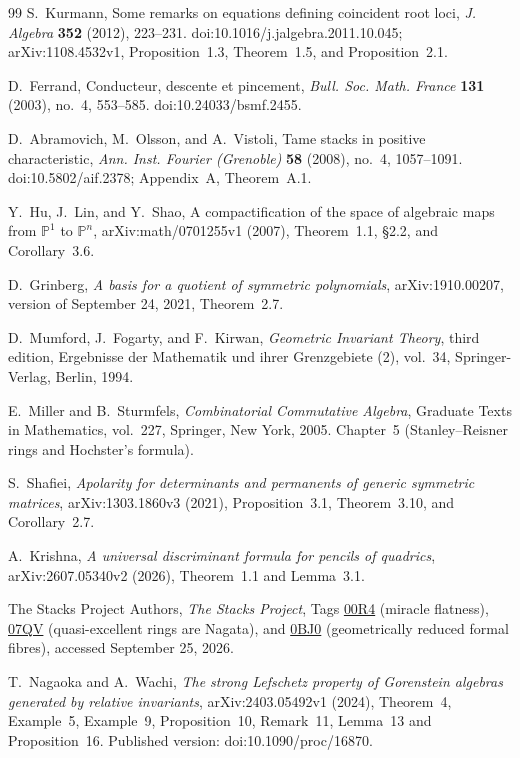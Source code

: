 \documentclass[11pt,reqno]{amsart}
\numberwithin{equation}{section}
\theoremstyle{definition}\newtheorem{definition}[theorem]{Definition}
\theoremstyle{remark}\newtheorem{remark}[theorem]{Remark}
\newcommand{\Pj}{\mathbb P}\newcommand{\A}{\mathbb A}
\begin{document}
\begin{thebibliography}{99}
S.~Kurmann, Some remarks on equations defining coincident root loci,
\emph{J. Algebra} \textbf{352} (2012), 223--231.
doi:10.1016/j.jalgebra.2011.10.045;
arXiv:1108.4532v1, Proposition~1.3, Theorem~1.5,
and Proposition~2.1.

D.~Ferrand, Conducteur, descente et pincement,
\emph{Bull. Soc. Math. France} \textbf{131} (2003), no.~4, 553--585.
doi:10.24033/bsmf.2455.

D.~Abramovich, M.~Olsson, and A.~Vistoli, Tame stacks in positive
characteristic, \emph{Ann. Inst. Fourier (Grenoble)}
\textbf{58} (2008), no.~4, 1057--1091.
doi:10.5802/aif.2378; Appendix~A, Theorem~A.1.

Y.~Hu, J.~Lin, and Y.~Shao, A compactification of the space of
algebraic maps from $\Pj^1$ to $\Pj^n$,
arXiv:math/0701255v1 (2007), Theorem~1.1,
\S2.2, and Corollary~3.6.


D.~Grinberg, \emph{A basis for a quotient of symmetric polynomials},
arXiv:1910.00207, version of September 24, 2021, Theorem~2.7.

D.~Mumford, J.~Fogarty, and F.~Kirwan,
\emph{Geometric Invariant Theory}, third edition,
Ergebnisse der Mathematik und ihrer Grenzgebiete (2), vol.~34,
Springer-Verlag, Berlin, 1994.

E.~Miller and B.~Sturmfels, \emph{Combinatorial Commutative Algebra},
Graduate Texts in Mathematics, vol.~227, Springer, New York, 2005.
Chapter~5 (Stanley--Reisner rings and Hochster's formula).

S.~Shafiei, \emph{Apolarity for determinants and permanents of generic
symmetric matrices}, arXiv:1303.1860v3 (2021), Proposition~3.1,
Theorem~3.10, and Corollary~2.7.

A.~Krishna, \emph{A universal discriminant formula for pencils of
quadrics}, arXiv:2607.05340v2 (2026), Theorem~1.1 and Lemma~3.1.

The Stacks Project Authors, \emph{The Stacks Project},
Tags \href{https://stacks.math.columbia.edu/tag/00R4}{00R4}
(miracle flatness),
\href{https://stacks.math.columbia.edu/tag/07QV}{07QV}
(quasi-excellent rings are Nagata), and
\href{https://stacks.math.columbia.edu/tag/0BJ0}{0BJ0}
(geometrically reduced formal fibres), accessed September 25, 2026.

T.~Nagaoka and A.~Wachi,
\emph{The strong Lefschetz property of Gorenstein algebras generated
by relative invariants}, arXiv:2403.05492v1 (2024),
Theorem~4, Example~5, Example~9, Proposition~10, Remark~11,
Lemma~13 and Proposition~16.
Published version: doi:10.1090/proc/16870.


\end{thebibliography}
\end{document}
